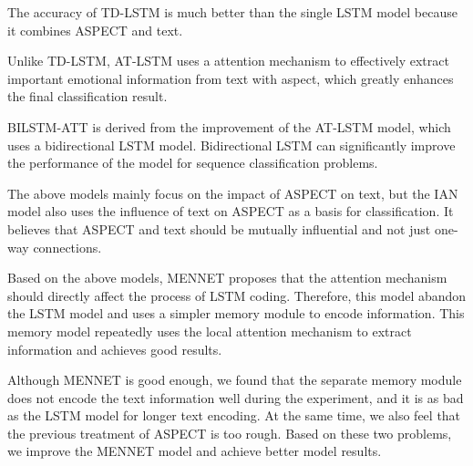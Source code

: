 \documentclass{ieeeaccess}
\begin{document}
The accuracy of TD-LSTM is much better than the single LSTM model because it combines ASPECT and text.


Unlike TD-LSTM, AT-LSTM uses a attention mechanism to effectively extract important emotional information from text with aspect, which greatly enhances the final classification result.


BILSTM-ATT is derived from the improvement of the AT-LSTM model, which uses a bidirectional LSTM model. Bidirectional LSTM can significantly improve the performance of the model for sequence classification problems.

The above models mainly focus on the impact of ASPECT on text, but the IAN model also uses the influence of text on ASPECT as a basis for classification. It believes that ASPECT and text should be mutually influential and not just one-way connections.

Based on the above models, MENNET proposes that the attention mechanism should directly affect the process of LSTM coding. Therefore, this model abandon the LSTM model and uses a simpler memory module to encode information. This memory model repeatedly uses the local attention mechanism to extract information and achieves good results.

Although MENNET is good enough, we found that the separate memory module does not encode the text information well during the experiment, and it is as bad as the LSTM model for longer text encoding. At the same time, we also feel that the previous treatment of ASPECT is too rough. Based on these two problems, we improve the MENNET model and achieve better model results.
\end{document}
